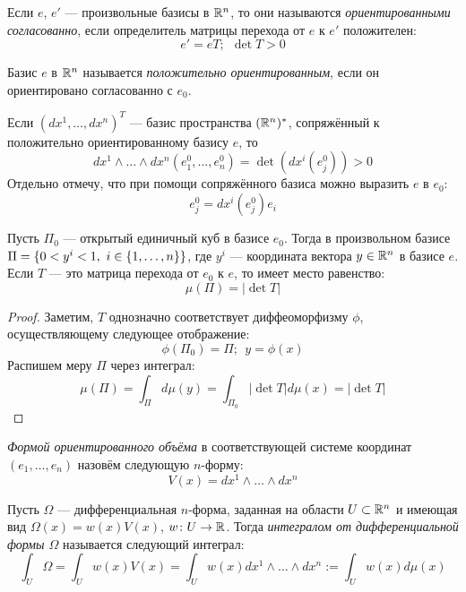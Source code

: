 \begin{definition}
	Если $e$, $e'$ --- произвольные базисы в $\mathbb{R}^n$, то они называются \textit{ориентированными согласованно}, если определитель матрицы перехода от $e$ к $e'$ положителен:
	\[
		e' = eT;\ \ \det T > 0
	\]
\end{definition}

\begin{definition}
	Базис $e$ в $\mathbb{R}^n$ называется \textit{положительно ориентированным}, если он ориентировано согласованно с $e_0$.
\end{definition}

\begin{note}
	Если $(dx^1, \ldots, dx^n)^T$ --- базис пространства $(\mathbb{R}^n)^*$, сопряжённый к положительно ориентированному базису $e$, то
	\[
		dx^1 \wedge \ldots \wedge dx^n(e_1^0, \ldots, e_n^0) = \det(dx^i(e_j^0)) > 0
	\]
	Отдельно отмечу, что при помощи сопряжённого базиса можно выразить $e$ в $e_0$:
	\[
		e_j^0 = dx^i(e_j^0) e_i
	\]
\end{note}

\begin{proposition}
	Пусть $\Pi_0$ --- открытый единичный куб в базисе $e_0$. Тогда в произвольном базисе $\Pi = \{0 < y^i < 1,\ i \in \{1, \ldots, n\}\}$, где $y^i$ --- координата вектора $y \in \mathbb{R}^n$ в базисе $e$. Если $T$ --- это матрица перехода от $e_0$ к $e$, то имеет место равенство:
	\[
		\mu(\Pi) = |\det T|
	\]
\end{proposition}

\begin{proof}
	Заметим, $T$ однозначно соответствует диффеоморфизму $\phi$, осуществляющему следующее отображение:
	\[
		\phi(\Pi_0) = \Pi;\ \ y = \phi(x)
	\]
	Распишем меру $\Pi$ через интеграл:
	\[
		\mu(\Pi) = \int_\Pi d\mu(y) = \int_{\Pi_0} |\det T| d\mu(x) = |\det T|
	\]
\end{proof}

\begin{definition}
	\textit{Формой ориентированного объёма} в соответствующей системе координат $(e_1, \ldots, e_n)$ назовём следующую $n$-форму:
	\[
		V(x) = dx^1 \wedge \ldots \wedge dx^n
	\]
\end{definition}

\begin{definition}
	Пусть $\Omega$ --- дифференциальная $n$-форма, заданная на области $U \subset \mathbb{R}^n$ и имеющая вид $\Omega(x) = w(x)V(x)$, $w \colon U \to \mathbb{R}$. Тогда \textit{интегралом от дифференциальной формы $\Omega$} называется следующий интеграл:
	\[
		\int_U \Omega = \int_U w(x)V(x) = \int_U w(x)dx^1 \wedge \ldots \wedge dx^n := \int_U w(x)d\mu(x)
	\]
\end{definition}

